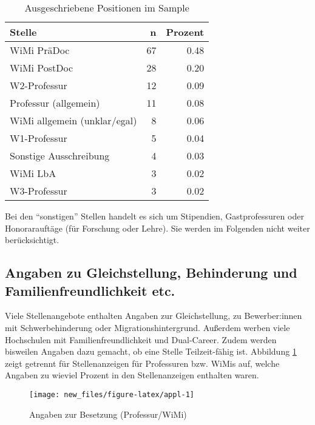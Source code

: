 \documentclass[
]{article}
\begin{document}
\begin{table}

\caption{\label{tab:position}Ausgeschriebene Positionen im Sample}
\centering
\begin{tabular}[t]{l|r|r}
\hline
Stelle & n & Prozent\\
\hline
WiMi PräDoc & 67 & 0.48\\
\hline
WiMi PostDoc & 28 & 0.20\\
\hline
W2-Professur & 12 & 0.09\\
\hline
Professur (allgemein) & 11 & 0.08\\
\hline
WiMi allgemein (unklar/egal) & 8 & 0.06\\
\hline
W1-Professur & 5 & 0.04\\
\hline
Sonstige Ausschreibung & 4 & 0.03\\
\hline
WiMi LbA & 3 & 0.02\\
\hline
W3-Professur & 3 & 0.02\\
\hline
\end{tabular}
\end{table}

Bei den ``sonstigen'' Stellen handelt es sich um Stipendien, Gastprofessuren oder Honorarauftäge (für Forschung oder Lehre). Sie werden im Folgenden nicht weiter berücksichtigt.

\hypertarget{angaben-zu-gleichstellung-behinderung-und-familienfreundlichkeit-etc.}{%
\subsection{Angaben zu Gleichstellung, Behinderung und Familienfreundlichkeit etc.}\label{angaben-zu-gleichstellung-behinderung-und-familienfreundlichkeit-etc.}}

Viele Stellenangebote enthalten Angaben zur Gleichstellung, zu Bewerber:innen mit Schwerbehinderung oder Migrationshintergrund. Außerdem werben viele Hochschulen mit Familienfreundlichkeit und Dual-Career. Zudem werden bisweilen Angaben dazu gemacht, ob eine Stelle Teilzeit-fähig ist. Abbildung \ref{fig:appl} zeigt getrennt für Stellenanzeigen für Professuren bzw. WiMis auf, welche Angaben zu wieviel Prozent in den Stellenanzeigen enthalten waren.

\begin{figure}

\texttt{[image: new\_files/figure-latex/appl-1]} \hfill{}

\caption{Angaben zur Besetzung (Professur/WiMi)}\label{fig:appl}
\end{figure}
\end{document}
